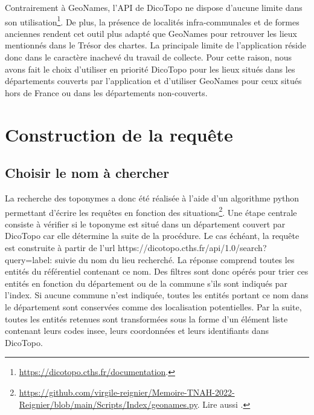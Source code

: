 \documentclass[a4paper,12pt,twoside]{book}
\begin{document}
	Contrairement à GeoNames, l'API de DicoTopo ne dispose d'aucune limite dans son utilisation\footnote{\url{https://dicotopo.cths.fr/documentation}.}. De plus, la présence de localités infra-communales et de formes anciennes rendent cet outil plus adapté que GeoNames pour retrouver les lieux mentionnés dans le Trésor des chartes. La principale limite de l'application réside donc dans le caractère inachevé du travail de collecte. Pour cette raison, nous avons fait le choix d'utiliser en priorité DicoTopo pour les lieux situés dans les départements couverts par l'application et d'utiliser GeoNames pour ceux situés hors de France ou dans les départements non-couverts.
	
	\section{Construction de la requête}
	
	\subsection{Choisir le nom à chercher}
	
	La recherche des toponymes a donc été réalisée à l'aide d'un algorithme python permettant d'écrire les requêtes en fonction des situations\footnote{\url{https://github.com/virgile-reignier/Memoire-TNAH-2022-Reignier/blob/main/Scripts/Index/geonames.py}. Lire aussi \cite{reignier_lindex_2022}.}. Une étape centrale consiste à vérifier si le toponyme est situé dans un département couvert par DicoTopo car elle détermine la suite de la procédure. Le cas échéant, la requête est construite à partir de l'url \og https://dicotopo.cths.fr/api/1.0/search?query=label: \fg{} suivie du nom du lieu recherché. La réponse comprend toutes les entités du référentiel contenant ce nom. Des filtres sont donc opérés pour trier ces entités en fonction du département ou de la commune s'ils sont indiqués par l'index. Si aucune commune n'est indiquée, toutes les entités portant ce nom dans le département sont conservées comme des localisation potentielles. Par la suite, toutes les entités retenues sont transformées sous la forme d'un élément liste contenant leurs codes insee, leurs coordonnées et leurs identifiants dans DicoTopo.
	
\end{document}
